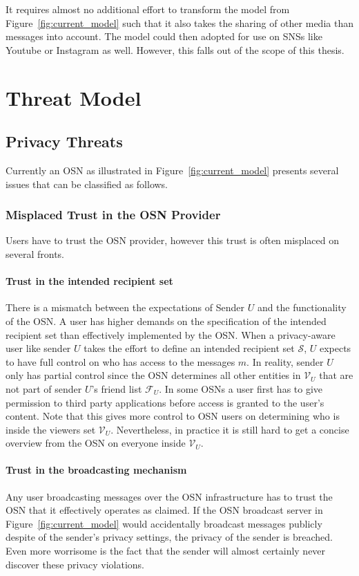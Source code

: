 It requires almost no additional effort to transform the model from Figure~\ref{fig:current_model} such that it also takes the sharing of other media than messages into account. The model could then adopted for use on SNSs like Youtube or Instagram as well. However, this falls out of the scope of this thesis.

\section{Threat Model}
\label{sec:threat_model}

\subsection{Privacy Threats}
\label{sec:issues_with_current_osn_situation}
Currently an OSN as illustrated in Figure~\ref{fig:current_model} presents several issues that can be classified as follows.

\subsubsection{Misplaced Trust in the OSN Provider}
Users have to trust the OSN provider, however this trust is often misplaced on several fronts.

\paragraph{Trust in the intended recipient set} There is a mismatch between the expectations of Sender $U$ and the functionality of the OSN. A user has higher demands on the specification of the intended recipient set than effectively implemented by the OSN. When a privacy-aware user like sender $U$ takes the effort to define an intended recipient set $\mathcal{S}$, $U$ expects to have full control on who has access to the messages $m$. In reality, sender $U$ only has partial control since the OSN determines all other entities in $\mathcal{V}_U$ that are not part of sender $U$'s friend list $\mathcal{F}_U$. In some OSNs a user first has to give permission to third party applications before access is granted to the user's content. Note that this gives more control to OSN users on determining who is inside the viewers set $\mathcal{V}_U$. Nevertheless, in practice it is still hard to get a concise overview from the OSN on everyone inside $\mathcal{V}_U$.

\paragraph{Trust in the broadcasting mechanism} Any user broadcasting messages over the OSN infrastructure has to trust the OSN that it effectively operates as claimed. If the OSN broadcast server in Figure~\ref{fig:current_model} would accidentally broadcast messages publicly despite of the sender's privacy settings, the privacy of the sender is breached. Even more worrisome is the fact that the sender will almost certainly never discover these privacy violations.


